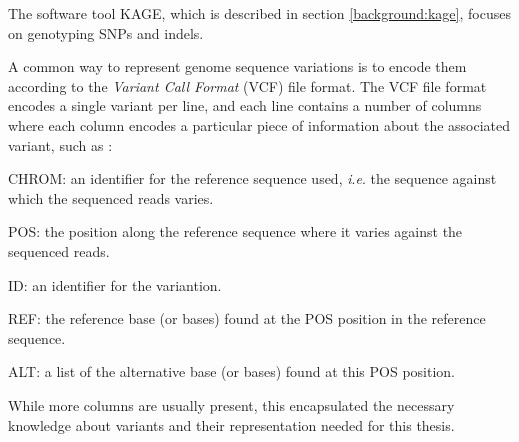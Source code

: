 The software tool KAGE, which is described in section \ref{background:kage}, focuses on genotyping SNPs and indels.

A common way to represent genome sequence variations is to encode them according to the \textit{Variant Call Format} (VCF) file format.
The VCF file format encodes a single variant per line, and each line contains a number of columns where each column encodes a particular piece of information about the associated variant, such as \cite{vcf}:
\begin{compactenum}
  \item
    CHROM: an identifier for the reference sequence used, \textit{i}.\textit{e}. the sequence against which the sequenced reads varies.
  \item
    POS: the position along the reference sequence where it varies against the sequenced reads.
  \item
    ID: an identifier for the variantion.
  \item
    REF: the reference base (or bases) found at the POS position in the reference sequence.
  \item
    ALT: a list of the alternative base (or bases) found at this POS position.
\end{compactenum}
While more columns are usually present, this encapsulated the necessary knowledge about variants and their representation needed for this thesis.


